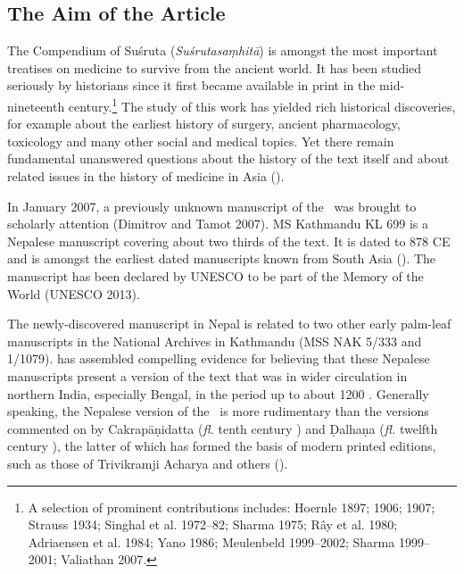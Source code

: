 
\subsection{The Aim of the Article}

The Compendium of Suśruta (\emph{Suśrutasaṃhitā}) is amongst the most important treatises on medicine to survive from the ancient world. It has been studied seriously by historians since it first became available in print in the mid-nineteenth century.\footnote{A selection of prominent contributions includes: Hoernle 1897; 1906; 1907; Strauss 1934; Singhal et al. 1972–82; Sharma 1975; Rây et al. 1980; Adriaensen et al. 1984; Yano 1986; Meulenbeld 1999–2002; Sharma 1999–2001; Valiathan 2007.} The study of this work has yielded rich historical discoveries, for example about the earliest history of surgery, ancient pharmacology, toxicology and many other social and medical topics. Yet there remain fundamental unanswered questions about the history of the text itself and about related issues in the history of medicine in Asia (\cite[IA, 203–389]{meul-hist}). 

In January 2007, a previously unknown manuscript of the \SS\ was brought to scholarly attention (Dimitrov and Tamot 2007). MS Kathmandu KL 699 is a Nepalese manuscript covering about two thirds of the text. It is dated to 878 CE and is amongst the earliest dated manuscripts known from South Asia (\cite[87–88]{hari-2011}). The manuscript has been declared by UNESCO to be part of the Memory of the World (UNESCO 2013).

The newly-discovered manuscript in Nepal is related to two other early palm-leaf manuscripts in the National Archives in Kathmandu (MSS NAK 5/333 and 1/1079). \citet{kleb-2010,kleb-2021b} has assembled compelling evidence for believing that these Nepalese manuscripts present a version of the text that was in wider circulation in northern India, especially Bengal, in the period up to about 1200 \AD. Generally speaking, the Nepalese version of the \SS\ is more rudimentary than the versions commented on by Cakrapāṇidatta (\emph{fl.} tenth century \AD) and Ḍalhaṇa (\emph{fl.} twelfth century \AD), the latter of which has formed the basis of modern printed editions, such as those of Trivikramji Acharya and others (\cite{susr-trikamji1,vulgate,shar-susr}). 

